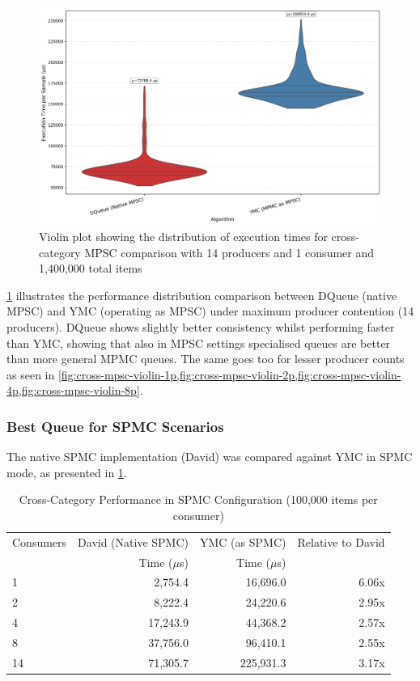 \begin{figure}[htb]
\centering
\caption{Violin plot showing the distribution of execution times for cross-category MPSC comparison with 14 producers and 1 consumer and 1,400,000 total items}
\label{fig:cross-mpsc-violin-14p}
\includegraphics[width=\textwidth]{images/results/best_in_mpsc_performance_violin_14P1C.png}
\end{figure}

\cref{fig:cross-mpsc-violin-14p} illustrates the performance distribution comparison between DQueue (native MPSC) and \ac{YMC} (operating as MPSC) under maximum producer contention (14 producers). DQueue shows slightly better consistency whilst performing faster than \ac{YMC}, showing that also in \ac{MPSC} settings specialised queues are better than more general \ac{MPMC} queues. The same goes too for lesser producer counts as seen in \cref{fig:cross-mpsc-violin-1p,fig:cross-mpsc-violin-2p,fig:cross-mpsc-violin-4p,fig:cross-mpsc-violin-8p}.

\subsubsection{Best Queue for \ac{SPMC} Scenarios}\label{subsubsec:cross-spmc}
The native \ac{SPMC} implementation (David) was compared against \ac{YMC} in \ac{SPMC} mode, as presented in \cref{tab:best-spmc}.

\begin{table}[htb]
\centering
\caption{Cross-Category Performance in \ac{SPMC} Configuration (100,000 items per consumer)}
\label{tab:best-spmc}
\begin{tabular}{@{}lrrr@{}}
\toprule
Consumers & David (Native \ac{SPMC}) & \ac{YMC} (as \ac{SPMC}) & Relative to David \\
& Time ($\mu$s) & Time ($\mu$s) & \\
\midrule
1 & 2,754.4 & 16,696.0 & 6.06x \\
2 & 8,222.4 & 24,220.6 & 2.95x \\
4 & 17,243.9 & 44,368.2 & 2.57x \\
8 & 37,756.0 & 96,410.1 & 2.55x \\
14 & 71,305.7 & 225,931.3 & 3.17x \\
\bottomrule
\end{tabular}
\end{table}

